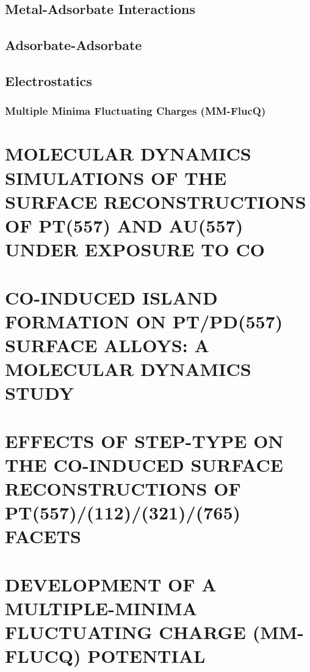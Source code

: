 \documentclass[draft]{nddiss2e}
\begin{document}
\section{Metal-Adsorbate Interactions}
% 

\section{Adsorbate-Adsorbate}



\section{Electrostatics}


\subsection{Multiple Minima Fluctuating Charges (MM-FlucQ)}


\chapter{MOLECULAR DYNAMICS SIMULATIONS OF THE SURFACE RECONSTRUCTIONS OF PT(557) AND AU(557) UNDER EXPOSURE TO CO}


\chapter{CO-INDUCED ISLAND FORMATION ON PT/PD(557) SURFACE ALLOYS: A MOLECULAR DYNAMICS STUDY}


\chapter{EFFECTS OF STEP-TYPE ON THE CO-INDUCED SURFACE RECONSTRUCTIONS OF PT(557)/(112)/(321)/(765) FACETS}


\chapter{DEVELOPMENT OF A MULTIPLE-MINIMA FLUCTUATING CHARGE (MM-FLUCQ) POTENTIAL}
\end{document}
